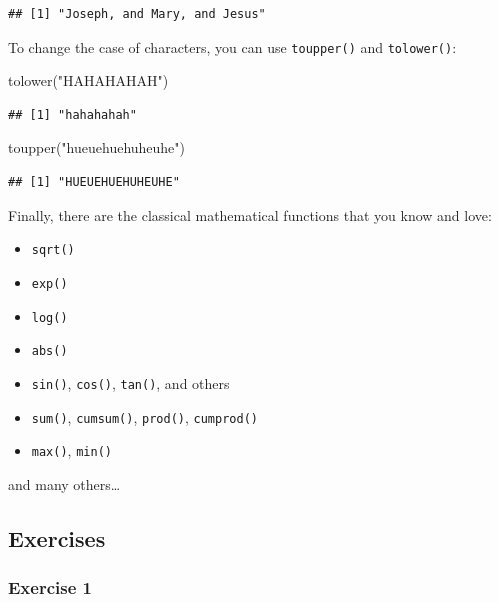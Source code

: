 \documentclass[
]{article}
\newenvironment{Shaded}{\begin{snugshade}}{\end{snugshade}}
\newcommand{\FunctionTok}[1]{\textcolor[rgb]{0.00,0.00,0.00}{#1}}
\newcommand{\NormalTok}[1]{#1}
\newcommand{\StringTok}[1]{\textcolor[rgb]{0.31,0.60,0.02}{#1}}
\providecommand{\tightlist}{%
  \setlength{\itemsep}{0pt}\setlength{\parskip}{0pt}}
\begin{document}
\begin{verbatim}
## [1] "Joseph, and Mary, and Jesus"
\end{verbatim}

To change the case of characters, you can use \texttt{toupper()} and \texttt{tolower()}:

\begin{Shaded}
\begin{Highlighting}[]
\FunctionTok{tolower}\NormalTok{(}\StringTok{"HAHAHAHAH"}\NormalTok{)}
\end{Highlighting}
\end{Shaded}

\begin{verbatim}
## [1] "hahahahah"
\end{verbatim}

\begin{Shaded}
\begin{Highlighting}[]
\FunctionTok{toupper}\NormalTok{(}\StringTok{"hueuehuehuheuhe"}\NormalTok{)}
\end{Highlighting}
\end{Shaded}

\begin{verbatim}
## [1] "HUEUEHUEHUHEUHE"
\end{verbatim}

Finally, there are the classical mathematical functions that you know and love:

\begin{itemize}
\tightlist
\item
  \texttt{sqrt()}
\item
  \texttt{exp()}
\item
  \texttt{log()}
\item
  \texttt{abs()}
\item
  \texttt{sin()}, \texttt{cos()}, \texttt{tan()}, and others
\item
  \texttt{sum()}, \texttt{cumsum()}, \texttt{prod()}, \texttt{cumprod()}
\item
  \texttt{max()}, \texttt{min()}
\end{itemize}

and many others\ldots{}

\hypertarget{exercises-1}{%
\subsection{Exercises}\label{exercises-1}}

\hypertarget{exercise-1-1}{%
\subsubsection*{Exercise 1}\label{exercise-1-1}}
\end{document}
